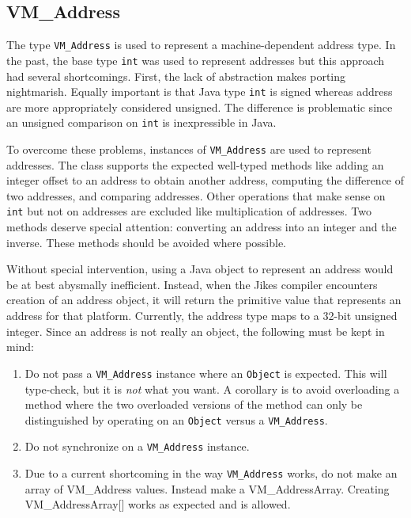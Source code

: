 \JikesTMFooter

\subsection{VM\_Address}
The type {\tt VM\_Address} is used to represent a machine-dependent
address type.  In the past, the base type {\tt int} was used to
represent addresses but this approach had several shortcomings.
First, the lack of abstraction makes porting nightmarish.  Equally
important is that Java type {\tt int} is signed whereas address are
more appropriately considered unsigned.  The difference is problematic
since an unsigned comparison on {\tt int} is inexpressible in Java.

To overcome these problems, instances of {\tt VM\_Address} are used to
represent addresses.  The class supports the expected well-typed
methods like adding an integer offset to an address to obtain another
address, computing the difference of two addresses, and comparing
addresses.  Other operations that make sense on {\tt int} but not on
addresses are excluded like multiplication of addresses.  Two methods
deserve special attention: converting an address into an integer and
the inverse.  These methods should be avoided where possible.

Without special intervention, using a Java object to represent an
address would be at best abysmally inefficient.  Instead, when the
Jikes compiler encounters creation of an address object, it will
return the primitive value that represents an address for that
platform.  Currently, the address type maps to a 32-bit unsigned
integer.  Since an address is not really an object, the following must
be kept in mind:

\begin{enumerate}
\item{} Do not pass a {\tt VM\_Address} instance where an {\tt Object}
is expected. This will type-check, but it is {\em not} what you want.  A
corollary is to avoid overloading a method where the two overloaded
versions of the method can only be distinguished by operating on an
{\tt Object}  versus a {\tt VM\_Address}. 
\item{} Do not synchronize on a {\tt VM\_Address} instance.
\item{} Due to a current shortcoming in the way {\tt VM\_Address} works, do not make an
array of {VM\_Address} values.  Instead make a
{VM\_AddressArray}. Creating {VM\_AddressArray[]} works as expected
and is allowed.
\end{enumerate}


